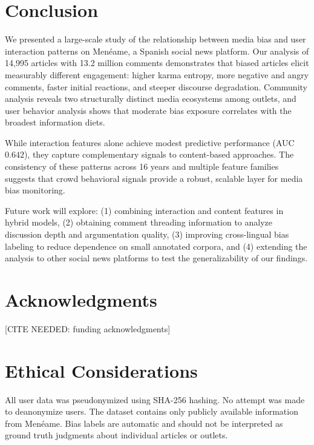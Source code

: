 \section{Conclusion}
\label{sec:conclusion}

We presented a large-scale study of the relationship between media bias and user interaction patterns on Men\'eame, a Spanish social news platform.
Our analysis of 14,995 articles with 13.2 million comments demonstrates that biased articles elicit measurably different engagement: higher karma entropy, more negative and angry comments, faster initial reactions, and steeper discourse degradation.
Community analysis reveals two structurally distinct media ecosystems among outlets, and user behavior analysis shows that moderate bias exposure correlates with the broadest information diets.

While interaction features alone achieve modest predictive performance (AUC $0.642$), they capture complementary signals to content-based approaches.
The consistency of these patterns across 16 years and multiple feature families suggests that crowd behavioral signals provide a robust, scalable layer for media bias monitoring.

Future work will explore: (1) combining interaction and content features in hybrid models, (2) obtaining comment threading information to analyze discussion depth and argumentation quality, (3) improving cross-lingual bias labeling to reduce dependence on small annotated corpora, and (4) extending the analysis to other social news platforms to test the generalizability of our findings.

\section*{Acknowledgments}

[CITE NEEDED: funding acknowledgments]

\section*{Ethical Considerations}

All user data was pseudonymized using SHA-256 hashing.
No attempt was made to deanonymize users.
The dataset contains only publicly available information from Men\'eame.
Bias labels are automatic and should not be interpreted as ground truth judgments about individual articles or outlets.
